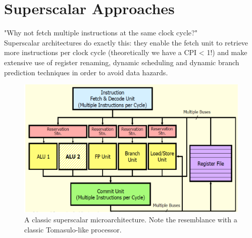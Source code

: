 \documentclass[10pt,a4paper]{article}
\begin{document}
		\section{Superscalar Approaches}
			"Why not fetch multiple instructions at the same clock cycle?"\\
			Superscalar architectures do exactly this: they enable the fetch unit to retrieve more instructions per clock cycle (theoretically we have a CPI < 1!) and make extensive use of register renaming, dynamic scheduling and dynamic branch prediction techniques in order to avoid data hazards.
			\begin{figure}[H]
				\centering
				\includegraphics[width = \textwidth]{./images/superscalar.png}
				\caption{A classic superscalar microarchitecture. Note the resemblance with a classic Tomasulo-like processor.}
			\end{figure}
			
\end{document}
